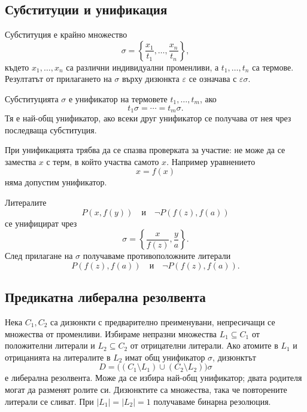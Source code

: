 \subsection{Субституции и унификация}\label{s:22.3.1}

\begin{defn}
Субституция е крайно множество
\[
\sigma=
\left\{
\frac{x_1}{t_1},\ldots,\frac{x_n}{t_n}
\right\},
\]
където $x_1,\ldots,x_n$ са различни индивидуални променливи, а $t_1,\ldots,t_n$ са термове. Резултатът от прилагането на $\sigma$ върху дизюнкта $\varepsilon$ се означава с $\varepsilon\sigma$.
\end{defn}

\begin{defn}
Субституцията $\sigma$ е унификатор на термовете $t_1,\ldots,t_m$, ако
\[
t_1\sigma=\cdots=t_m\sigma.
\]
Тя е най-общ унификатор, ако всеки друг унификатор се получава от нея чрез последваща субституция.
\end{defn}

При унификацията трябва да се спазва проверката за участие: не може да се замества $x$ с терм, в който участва самото $x$. Например уравнението
\[
x=f(x)
\]
няма допустим унификатор.

\begin{example}
Литералите
\[
P(x,f(y))
\quad\text{и}\quad
\neg P(f(z),f(a))
\]
се унифицират чрез
\[
\sigma=
\left\{
\frac{x}{f(z)},
\frac{y}{a}
\right\}.
\]
След прилагане на $\sigma$ получаваме противоположните литерали
\[
P(f(z),f(a))
\quad\text{и}\quad
\neg P(f(z),f(a)).
\]
\end{example}

\subsection{Предикатна либерална резолвента}\label{s:22.3.2}

\begin{defn}
Нека $C_1,C_2$ са дизюнкти с предварително преименувани, непресичащи се множества от променливи. Избираме непразни множества $L_1\subseteq C_1$ от положителни литерали и $L_2\subseteq C_2$ от отрицателни литерали. Ако атомите в $L_1$ и отрицанията на литералите в $L_2$ имат общ унификатор $\sigma$, дизюнктът
\[
D=\bigl((C_1\setminus L_1)\cup(C_2\setminus L_2)\bigr)\sigma
\]
е либерална резолвента. Може да се избира най-общ унификатор; двата родителя могат да разменят ролите си. Дизюнктите са множества, така че повторените литерали се сливат. При $|L_1|=|L_2|=1$ получаваме бинарна резолюция.
\end{defn}

